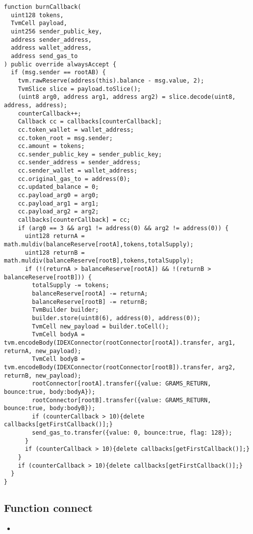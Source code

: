 \begin{lstlisting}[firstnumber=522]
function burnCallback(
  uint128 tokens,
  TvmCell payload,
  uint256 sender_public_key,
  address sender_address,
  address wallet_address,
  address send_gas_to
) public override alwaysAccept {
  if (msg.sender == rootAB) {
    tvm.rawReserve(address(this).balance - msg.value, 2);
    TvmSlice slice = payload.toSlice();
    (uint8 arg0, address arg1, address arg2) = slice.decode(uint8, address, address);
    counterCallback++;
    Callback cc = callbacks[counterCallback];
    cc.token_wallet = wallet_address;
    cc.token_root = msg.sender;
    cc.amount = tokens;
    cc.sender_public_key = sender_public_key;
    cc.sender_address = sender_address;
    cc.sender_wallet = wallet_address;
    cc.original_gas_to = address(0);
    cc.updated_balance = 0;
    cc.payload_arg0 = arg0;
    cc.payload_arg1 = arg1;
    cc.payload_arg2 = arg2;
    callbacks[counterCallback] = cc;
    if (arg0 == 3 && arg1 != address(0) && arg2 != address(0)) {
      uint128 returnA = math.muldiv(balanceReserve[rootA],tokens,totalSupply);
      uint128 returnB = math.muldiv(balanceReserve[rootB],tokens,totalSupply);
      if (!(returnA > balanceReserve[rootA]) && !(returnB > balanceReserve[rootB])) {
        totalSupply -= tokens;
        balanceReserve[rootA] -= returnA;
        balanceReserve[rootB] -= returnB;
        TvmBuilder builder;
        builder.store(uint8(6), address(0), address(0));
        TvmCell new_payload = builder.toCell();
        TvmCell bodyA = tvm.encodeBody(IDEXConnector(rootConnector[rootA]).transfer, arg1, returnA, new_payload);
        TvmCell bodyB = tvm.encodeBody(IDEXConnector(rootConnector[rootB]).transfer, arg2, returnB, new_payload);
        rootConnector[rootA].transfer({value: GRAMS_RETURN, bounce:true, body:bodyA});
        rootConnector[rootB].transfer({value: GRAMS_RETURN, bounce:true, body:bodyB});
        if (counterCallback > 10){delete callbacks[getFirstCallback()];}
        send_gas_to.transfer({value: 0, bounce:true, flag: 128});
      }
      if (counterCallback > 10){delete callbacks[getFirstCallback()];}
    }
    if (counterCallback > 10){delete callbacks[getFirstCallback()];}
  }
}
\end{lstlisting}

\subsection{Function connect}

\begin{itemize}
\item \issueEncodeBody
\end{itemize}

